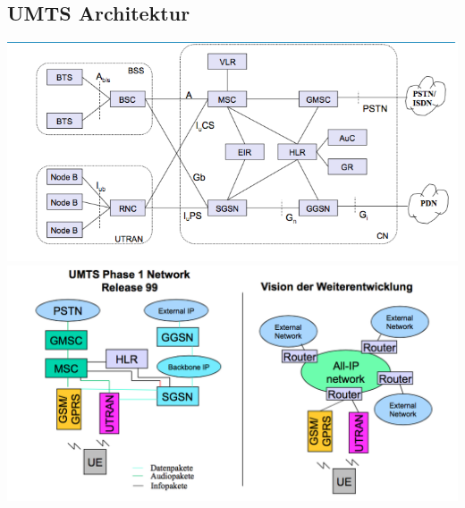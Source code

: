 \subsection{UMTS Architektur}
\begin{minipage}{0.5\linewidth}
\includegraphics[width = \linewidth]{./Pics/UMTSArch} \\
\includegraphics[width = \linewidth]{./Pics/UMTSArch3}
\end{minipage}
